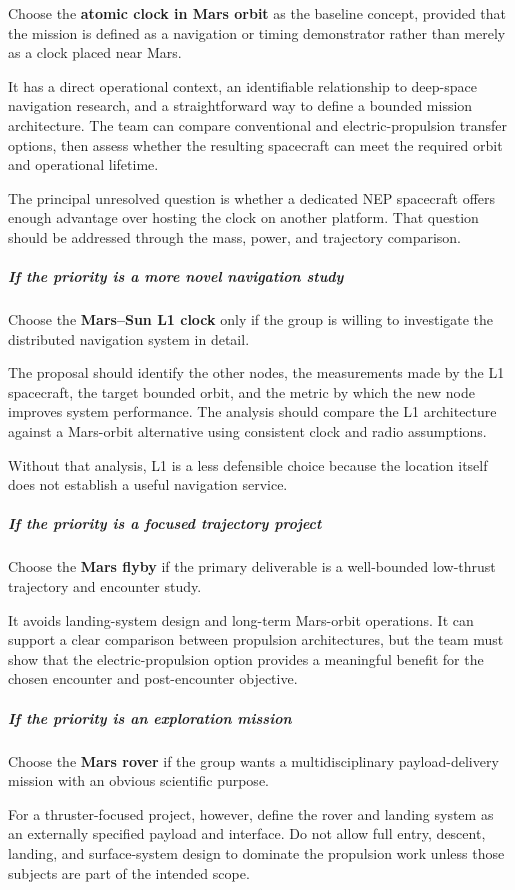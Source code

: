 Choose the \textbf{atomic clock in Mars orbit} as the baseline
concept, provided that the mission is defined as a navigation
or timing demonstrator rather than merely as a clock placed
near Mars.

It has a direct operational context, an identifiable relationship
to deep-space navigation research, and a straightforward
way to define a bounded mission architecture. The team can
compare conventional and electric-propulsion transfer options,
then assess whether the resulting spacecraft can meet the
required orbit and operational lifetime.

The principal unresolved question is whether a dedicated
NEP spacecraft offers enough advantage over hosting the
clock on another platform. That question should be addressed
through the mass, power, and trajectory comparison.

\subparagraph{If the priority is a more novel navigation study}

Choose the \textbf{Mars--Sun L1 clock} only if the group is
willing to investigate the distributed navigation system
in detail.

The proposal should identify the other nodes, the measurements
made by the L1 spacecraft, the target bounded orbit, and the
metric by which the new node improves system performance.
The analysis should compare the L1 architecture against
a Mars-orbit alternative using consistent clock and radio
assumptions.

Without that analysis, L1 is a less defensible choice because
the location itself does not establish a useful navigation
service.

\subparagraph{If the priority is a focused trajectory project}

Choose the \textbf{Mars flyby} if the primary deliverable is
a well-bounded low-thrust trajectory and encounter study.

It avoids landing-system design and long-term Mars-orbit
operations. It can support a clear comparison between
propulsion architectures, but the team must show that the
electric-propulsion option provides a meaningful benefit
for the chosen encounter and post-encounter objective.

\subparagraph{If the priority is an exploration mission}

Choose the \textbf{Mars rover} if the group wants a
multidisciplinary payload-delivery mission with an obvious
scientific purpose.

For a thruster-focused project, however, define the rover
and landing system as an externally specified payload and
interface. Do not allow full entry, descent, landing, and
surface-system design to dominate the propulsion work unless
those subjects are part of the intended scope.

